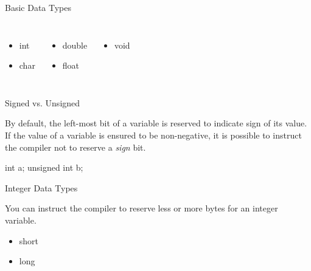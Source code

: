 \documentclass[compress]{beamer}
\begin{document}
\begin{slide}
	\begin{block}{Basic Data Types}

	\begin{columns}
	\begin{itemize}
	\item[] int
	\item[] char
	\end{itemize}

	\begin{itemize}
	\item[] double
	\item[] float
	\end{itemize}

	\begin{itemize}
	\item[] void
	\end{itemize}
	\end{columns}

	\end{block}
\end{slide}

\begin{slide}
	\begin{block}{Signed vs. Unsigned}

	By default, the left-most bit of a variable is reserved to indicate sign of its value.
	If the value of a variable is ensured to be non-negative, it is possible to instruct the compiler not to reserve a \emph{sign} bit.

	\begin{terminal}
	int a;
	unsigned int b;
	\end{terminal}

	\end{block}
\end{slide}

\begin{slide}
	\begin{block}{Integer Data Types}

	You can instruct the compiler to reserve less or more bytes for an integer variable.

	\begin{itemize}
	\item[] short
	\item[] long
	\end{itemize}

	\end{block}
\end{slide}
\end{document}
